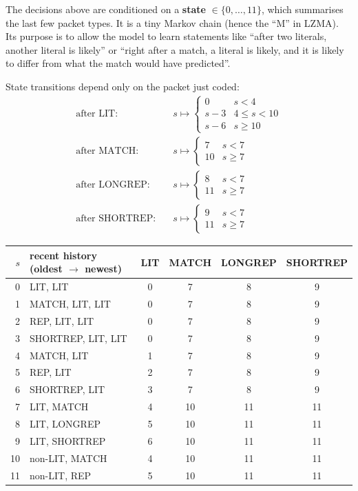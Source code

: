\documentclass[11pt,a4paper,oneside]{book}
\begin{document}
The decisions above are conditioned on a \textbf{state} $\in\{0,\dots,11\}$, which summarises the last few packet types. It is a tiny
Markov chain (hence the ``M'' in LZMA). Its purpose is to allow the model to learn statements like ``after two literals, another literal is
likely'' or ``right after a match, a literal is likely, and it is likely to differ from what the match would have predicted''.

State transitions depend only on the packet just coded:
\begin{align*}
\text{after LIT:}&\quad s\mapsto \begin{cases}0 & s<4\\ s-3 & 4\le s<10\\ s-6 & s\ge10\end{cases}\\
\text{after MATCH:}&\quad s\mapsto \begin{cases}7 & s<7\\ 10 & s\ge7\end{cases}\\
\text{after LONGREP:}&\quad s\mapsto \begin{cases}8 & s<7\\ 11 & s\ge7\end{cases}\\
\text{after SHORTREP:}&\quad s\mapsto \begin{cases}9 & s<7\\ 11 & s\ge7\end{cases}
\end{align*}

\begin{center}
\small
\begin{tabular}{rlcccc}
\toprule
$s$ & recent history (oldest $\to$ newest) & LIT & MATCH & LONGREP & SHORTREP\\
\midrule
0 & LIT, LIT & 0 & 7 & 8 & 9\\
1 & MATCH, LIT, LIT & 0 & 7 & 8 & 9\\
2 & REP, LIT, LIT & 0 & 7 & 8 & 9\\
3 & SHORTREP, LIT, LIT & 0 & 7 & 8 & 9\\
4 & MATCH, LIT & 1 & 7 & 8 & 9\\
5 & REP, LIT & 2 & 7 & 8 & 9\\
6 & SHORTREP, LIT & 3 & 7 & 8 & 9\\
7 & LIT, MATCH & 4 & 10 & 11 & 11\\
8 & LIT, LONGREP & 5 & 10 & 11 & 11\\
9 & LIT, SHORTREP & 6 & 10 & 11 & 11\\
10 & non-LIT, MATCH & 4 & 10 & 11 & 11\\
11 & non-LIT, REP & 5 & 10 & 11 & 11\\
\bottomrule
\end{tabular}
\end{center}
\end{document}
